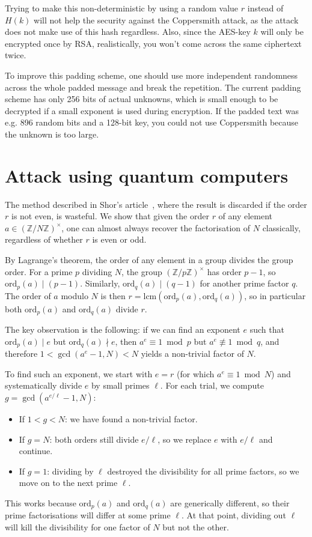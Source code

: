 \documentclass{article}
\begin{document}
Trying to make this non-deterministic by using a random value $r$ instead of $H(k)$ will not help the security against the Coppersmith attack, as the attack does not make use of this hash regardless. Also, since the AES-key $k$ will only be encrypted once by RSA, realistically, you won't come across the same ciphertext twice.

To improve this padding scheme, one should use more independent randomness across the whole padded message and break the repetition. The current padding scheme has only 256 bits of actual unknowns, which is small enough to be decrypted if a small exponent is used during encryption. If the padded text was e.g. 896 random bits and a 128-bit key, you could not use Coppersmith because the unknown is too large.~\cite{zhong}

\section{Attack using quantum computers}
The method described in Shor's article~\cite{shor}, where the result is discarded if the order $r$ is not even, is wasteful. We show that given the order $r$ of any element $a \in (\mathbb{Z}/N\mathbb{Z})^\times$, one can almost always recover the factorisation of $N$ classically, regardless of whether $r$ is even or odd.

By Lagrange's theorem, the order of any element in a group divides the group order. For a prime $p$ dividing $N$, the group $(\mathbb{Z}/p\mathbb{Z})^\times$ has order $p-1$, so $\mathrm{ord}_p(a) \mid (p-1)$. Similarly, $\mathrm{ord}_q(a) \mid (q-1)$ for another prime factor $q$. The order of $a$ modulo $N$ is then $r = \mathrm{lcm}(\mathrm{ord}_p(a), \mathrm{ord}_q(a))$, so in particular both $\mathrm{ord}_p(a)$ and $\mathrm{ord}_q(a)$ divide $r$.

The key observation is the following: if we can find an exponent $e$ such that $\mathrm{ord}_p(a) \mid e$ but $\mathrm{ord}_q(a) \nmid e$, then $a^e \equiv 1 \bmod p$ but $a^e \not\equiv 1 \bmod q$, and therefore $1 < \gcd(a^e - 1, N) < N$ yields a non-trivial factor of $N$.

To find such an exponent, we start with $e = r$ (for which $a^e \equiv 1 \bmod N$) and systematically divide $e$ by small primes $\ell$. For each trial, we compute $g = \gcd(a^{e/\ell} - 1, N)$:
\begin{itemize}
    \item If $1 < g < N$: we have found a non-trivial factor.
    \item If $g = N$: both orders still divide $e/\ell$, so we replace $e$ with $e/\ell$ and continue.
    \item If $g = 1$: dividing by $\ell$ destroyed the divisibility for all prime factors, so we move on to the next prime $\ell$.
\end{itemize}
This works because $\mathrm{ord}_p(a)$ and $\mathrm{ord}_q(a)$ are generically different, so their prime factorisations will differ at some prime $\ell$. At that point, dividing out $\ell$ will kill the divisibility for one factor of $N$ but not the other.
\end{document}
